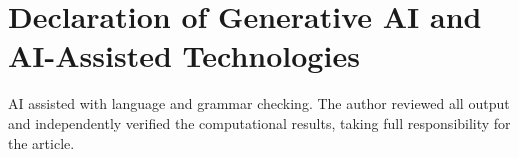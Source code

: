 \documentclass[preprint,12pt]{elsarticle}
\begin{document}
\section*{Declaration of Generative AI and AI-Assisted Technologies}
AI assisted with language and grammar checking. The author reviewed all output and independently verified the computational results, taking full responsibility for the article.



\end{document}
